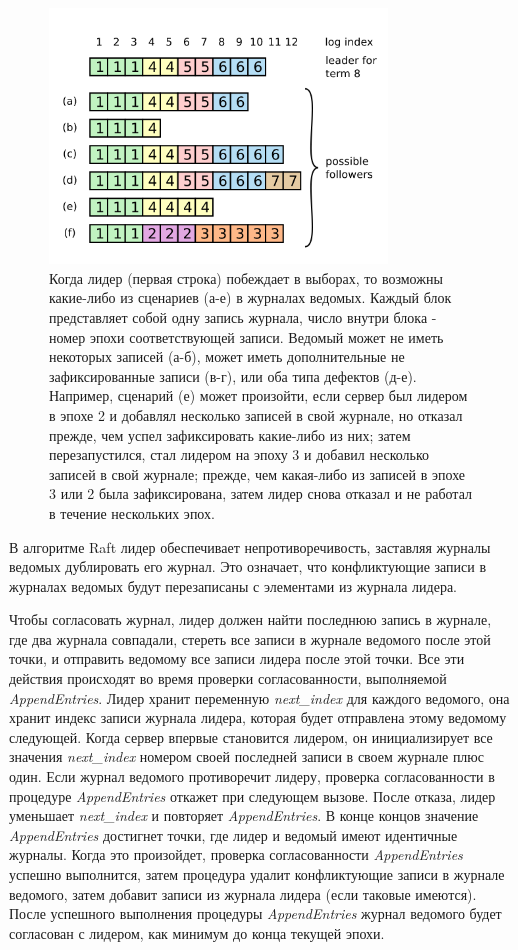\documentclass[subf, href, colorlinks=true, 14pt,
times, mtpro, specialist]{disser}
\theoremstyle{definition}
\begin{document}
\begin{figure}[H]
\centering
\includegraphics[width=0.8\textwidth]{src/pics/log_2.png}
\caption{Когда лидер (первая строка) побеждает в выборах, то возможны какие-либо из сценариев (а-е) в журналах ведомых. Каждый блок представляет собой одну запись журнала, число внутри блока - номер эпохи соответствующей записи. Ведомый может не иметь некоторых записей (а-б), может иметь дополнительные не зафиксированные записи (в-г), или оба типа дефектов (д-е). Например, сценарий (е) может произойти, если сервер был лидером в эпохе 2 и добавлял несколько записей в свой журнале, но отказал прежде, чем успел зафиксировать какие-либо из них; затем перезапустился, стал лидером на эпоху 3 и добавил несколько записей в свой журнале; прежде, чем какая-либо из записей в эпохе 3 или 2 была зафиксирована, затем лидер снова отказал и не работал в течение нескольких эпох.}
\label{fig:log_2}
\end{figure}

В алгоритме Raft лидер обеспечивает непротиворечивость, заставляя журналы ведомых дублировать его журнал. Это означает, что конфликтующие записи в журналах ведомых будут перезаписаны с элементами из журнала лидера.

Чтобы согласовать журнал, лидер должен найти последнюю запись в журнале, где два журнала совпадали, стереть все записи в журнале ведомого после этой точки, и отправить ведомому все записи лидера после этой точки. Все эти действия происходят во время проверки согласованности, выполняемой \textit{AppendEntries}. Лидер хранит переменную \textit{next\_index} для каждого ведомого, она хранит индекс записи журнала лидера, которая будет отправлена этому ведомому следующей. Когда сервер впервые становится лидером, он инициализирует все значения \textit{next\_index} номером своей последней записи в своем журнале плюс один. Если журнал ведомого противоречит лидеру, проверка согласованности в процедуре \textit{AppendEntries} откажет при следующем вызове. После отказа, лидер уменьшает \textit{next\_index} и повторяет \textit{AppendEntries}. В конце концов значение \textit{AppendEntries} достигнет точки, где лидер и ведомый имеют идентичные журналы. Когда это произойдет, проверка согласованности \textit{AppendEntries} успешно выполнится, затем процедура удалит конфликтующие записи в журнале ведомого, затем добавит записи из журнала лидера (если таковые имеются). После успешного выполнения процедуры \textit{AppendEntries} журнал ведомого будет согласован с лидером, как минимум до конца текущей эпохи.
\end{document}
